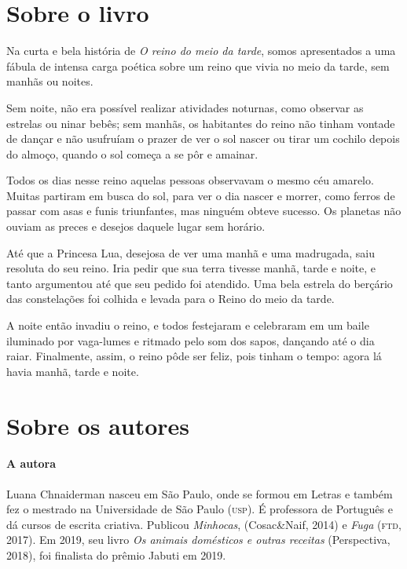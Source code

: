 \documentclass[11pt]{extarticle}
\begin{document}
\section{Sobre o livro}
Na curta e bela história de \textit{O reino do meio da tarde}, somos apresentados a uma fábula de intensa carga poética sobre um reino que vivia no meio da tarde, sem manhãs ou noites.

Sem noite, não era possível realizar atividades noturnas, como observar as estrelas ou ninar bebês; sem manhãs, os habitantes do reino não tinham vontade de dançar e não usufruíam o prazer de ver o sol nascer ou tirar um cochilo depois do almoço, quando o sol começa a se pôr e amainar.

Todos os dias nesse reino aquelas pessoas observavam o mesmo céu amarelo. Muitas partiram em busca do sol, para ver o dia nascer e morrer, como ferros de passar com asas e funis triunfantes, mas ninguém obteve sucesso. Os planetas não ouviam as preces e desejos daquele lugar sem horário.

Até que a Princesa Lua, desejosa de ver uma manhã e uma madrugada, saiu resoluta do seu reino. Iria pedir que sua terra tivesse manhã, tarde e noite, e tanto argumentou até que seu pedido foi atendido. Uma bela estrela do berçário das constelações foi colhida e levada para o Reino do meio da tarde.

A noite então invadiu o reino, e todos festejaram e celebraram em um baile iluminado por vaga-lumes e ritmado pelo som dos sapos, dançando até o dia raiar. Finalmente, assim, o reino pôde ser feliz, pois tinham o tempo: agora lá havia manhã, tarde e noite.

\reversemarginpar
\marginparwidth=5cm



\section{Sobre os autores}

\paragraph{A autora} Luana Chnaiderman nasceu em São Paulo, onde se formou em Letras e também fez o mestrado na Universidade de São Paulo (\textsc{usp}). É professora de Português e dá cursos de escrita criativa. Publicou \textit{Minhocas}, (Cosac\&Naif, 2014) e \textit{Fuga} (\textsc{ftd}, 2017). Em 2019, seu livro \textit{Os animais domésticos e outras receitas} (Perspectiva, 2018), foi finalista do prêmio Jabuti em 2019.
\end{document}
